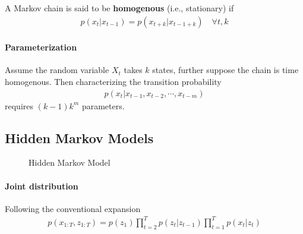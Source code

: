 \documentclass{article}
\begin{document}
	\begin{definition}
		A Markov chain is said to be \textbf{homogenous} (i.e., stationary) if
		\begin{align}
			p\left(x_{t} | x_{t-1}\right)=p\left(x_{t+k} | x_{t-1+k}\right) \quad \forall t, k
		\end{align}
	\end{definition}
	
	\paragraph{Parameterization} Assume the random variable $X_t$ takes $k$ states, further suppose the chain is time homogenous. Then characterizing the transition probability
	\begin{align}
		p(x_t | x_{t-1}, x_{t-2}, \cdots, x_{t-m})
	\end{align}
	requires $(k-1) k^m$ parameters.
	
	\subsection{Hidden Markov Models}
		\begin{figure}[H]
		\centering
		\caption{Hidden Markov Model}
	\end{figure}
	
	\paragraph{Joint distribution} Following the conventional expansion
	\begin{align}
		p(x_{1:T}, z_{1:T}) = p(z_1) \prod_{t=2}^T p(z_t|z_{t-1}) \prod_{t=1}^T p(x_t|z_t)
	\end{align}
	
\end{document}
